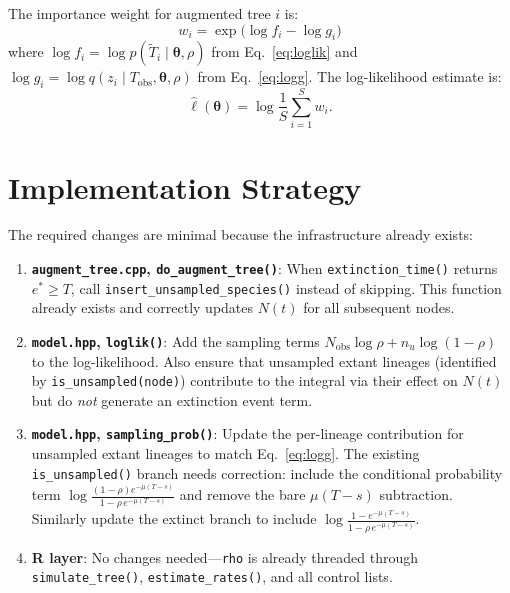 \documentclass[11pt]{article}
\newcommand{\btheta}{\boldsymbol{\theta}}
\newcommand{\Tobs}{T_{\mathrm{obs}}}
\newcommand{\Nobs}{N_{\mathrm{obs}}}
\begin{document}
The importance weight for augmented tree $i$ is:
\begin{equation}
w_i = \exp\bigl(\log f_i - \log g_i\bigr)
\end{equation}
where $\log f_i = \log p(\tilde{T}_i \mid \btheta, \rho)$ from Eq.~\eqref{eq:loglik} and $\log g_i = \log q(z_i \mid \Tobs, \btheta, \rho)$ from Eq.~\eqref{eq:logg}. The log-likelihood estimate is:
\begin{equation}
\hat{\ell}(\btheta) = \log \frac{1}{S} \sum_{i=1}^{S} w_i.
\end{equation}

\section{Implementation Strategy}

The required changes are minimal because the infrastructure already exists:

\begin{enumerate}
\item \textbf{\texttt{augment\_tree.cpp}, \texttt{do\_augment\_tree()}}: When \texttt{extinction\_time()} returns $e^* \geq T$, call \texttt{insert\_unsampled\_species()} instead of skipping. This function already exists and correctly updates $N(t)$ for all subsequent nodes.

\item \textbf{\texttt{model.hpp}, \texttt{loglik()}}: Add the sampling terms $\Nobs \log \rho + n_u \log(1-\rho)$ to the log-likelihood. Also ensure that unsampled extant lineages (identified by \texttt{is\_unsampled(node)}) contribute to the integral via their effect on $N(t)$ but do \emph{not} generate an extinction event term.

\item \textbf{\texttt{model.hpp}, \texttt{sampling\_prob()}}: Update the per-lineage contribution for unsampled extant lineages to match Eq.~\eqref{eq:logg}. The existing \texttt{is\_unsampled()} branch needs correction: include the conditional probability term $\log\frac{(1-\rho) e^{-\mu(T-s)}}{1 - \rho\, e^{-\mu(T-s)}}$ and remove the bare $\mu(T-s)$ subtraction. Similarly update the extinct branch to include $\log\frac{1 - e^{-\mu(T-s)}}{1 - \rho\, e^{-\mu(T-s)}}$.

\item \textbf{R layer}: No changes needed---\texttt{rho} is already threaded through \texttt{simulate\_tree()}, \texttt{estimate\_rates()}, and all control lists.
\end{enumerate}
\end{document}
